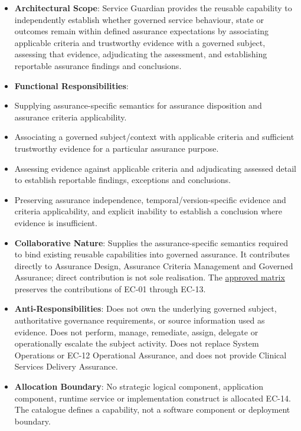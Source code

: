 \begin{itemize}


\item \textbf{Architectural Scope}: Service Guardian provides the reusable capability to independently establish whether governed service behaviour, state or outcomes remain within defined assurance expectations by associating applicable criteria and trustworthy evidence with a governed subject, assessing that evidence, adjudicating the assessment, and establishing reportable assurance findings and conclusions.

\item \textbf{Functional Responsibilities}:

\item Supplying assurance-specific semantics for assurance disposition and assurance criteria applicability.

\item Associating a governed subject/context with applicable criteria and sufficient trustworthy evidence for a particular assurance purpose.

\item Assessing evidence against applicable criteria and adjudicating assessed detail to establish reportable findings, exceptions and conclusions.

\item Preserving assurance independence, temporal/version-specific evidence and criteria applicability, and explicit inability to establish a conclusion where evidence is insufficient.

\item \textbf{Collaborative Nature}: Supplies the assurance-specific semantics required to bind existing reusable capabilities into governed assurance. It contributes directly to Assurance Design, Assurance Criteria Management and Governed Assurance; direct contribution is not sole realisation. The \href{\detokenize{../../../../../docs/markdown/02-strategy/capability-maps/health-service-assurance-derivation.md#collaborative-enterprise-capability-contribution-matrix}}{approved matrix} preserves the contributions of EC-01 through EC-13.

\item \textbf{Anti-Responsibilities}: Does not own the underlying governed subject, authoritative governance requirements, or source information used as evidence. Does not perform, manage, remediate, assign, delegate or operationally escalate the subject activity. Does not replace System Operations or EC-12 Operational Assurance, and does not provide Clinical Services Delivery Assurance.

\item \textbf{Allocation Boundary}: No strategic logical component, application component, runtime service or implementation construct is allocated EC-14. The catalogue defines a capability, not a software component or deployment boundary.

\end{itemize}


